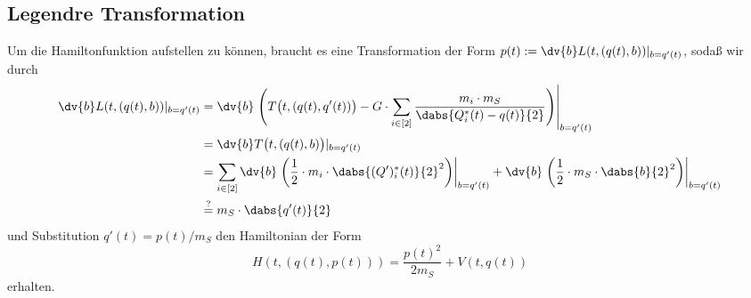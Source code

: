 \documentclass{subfiles}
\begin{document}
    \subsection*{Legendre Transformation}
        Um die Hamiltonfunktion aufstellen zu können, braucht es eine Transformation der Form $p(t):=\dv{b}L(t,(q(t),b))|_{b=q'(t)}$, sodaß wir durch 
        \begin{align*}
            \dv{b}L(t,(q(t),b))|_{b=q'(t)} &= \dv{b}\left.\Biggl(
                T\bigl(t,(q(t),q'(t))\bigr) - G\cdot\sum_{i\in[2]}\frac{m_i\cdot m_S}{\dabs{Q_i^*(t) - q(t)}{2}}    
            \Biggr)\right|_{b=q'(t)} \\
            &= \dv{b}T\bigl(t,(q(t),b)\bigr)|_{b=q'(t)} \\
            &= \sum_{i\in[2]}\dv{b}\left.\biggl(\frac12\cdot m_i\cdot\dabs{(Q')_i^*(t)}{2}^2\biggr)\right|_{b=q'(t)} + \dv{b}\left.\biggl(\frac12\cdot m_S\cdot\dabs{b}{2}^2\biggr)\right|_{b=q'(t)} \\
            &\stackrel{?}{=}m_S\cdot \dabs{q'(t)}{2}
        \end{align*}
        und Substitution $q'(t) = p(t) / m_S$ den Hamiltonian der Form 
        \[
            H(t,(q(t),p(t))) = \frac{p(t)^2}{2m_S} + V(t,q(t))
        \]
        erhalten. 
\end{document}
